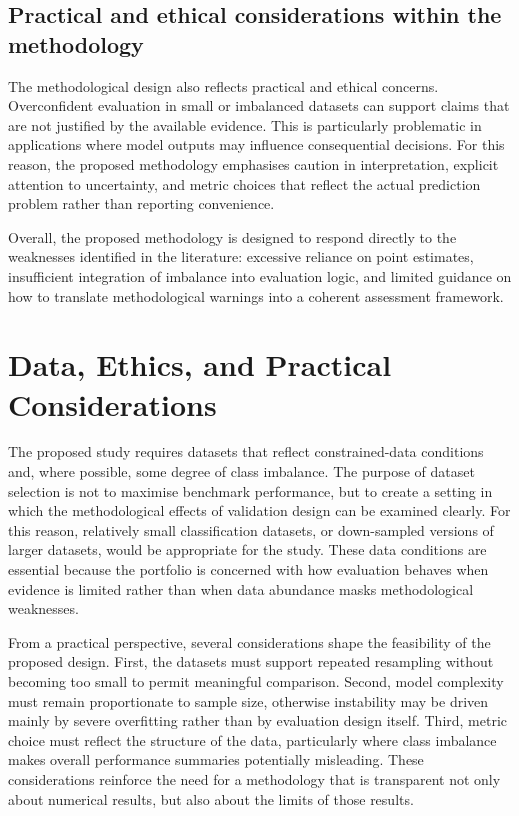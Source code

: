 \documentclass[11pt,a4paper]{article}
\begin{document}
\subsection{Practical and ethical considerations within the methodology}

The methodological design also reflects practical and ethical concerns. Overconfident evaluation in small or imbalanced datasets can support claims that are not justified by the available evidence. This is particularly problematic in applications where model outputs may influence consequential decisions. For this reason, the proposed methodology emphasises caution in interpretation, explicit attention to uncertainty, and metric choices that reflect the actual prediction problem rather than reporting convenience.

Overall, the proposed methodology is designed to respond directly to the weaknesses identified in the literature: excessive reliance on point estimates, insufficient integration of imbalance into evaluation logic, and limited guidance on how to translate methodological warnings into a coherent assessment framework.

\section{Data, Ethics, and Practical Considerations}

The proposed study requires datasets that reflect constrained-data conditions and, where possible, some degree of class imbalance. The purpose of dataset selection is not to maximise benchmark performance, but to create a setting in which the methodological effects of validation design can be examined clearly. For this reason, relatively small classification datasets, or down-sampled versions of larger datasets, would be appropriate for the study. These data conditions are essential because the portfolio is concerned with how evaluation behaves when evidence is limited rather than when data abundance masks methodological weaknesses.

From a practical perspective, several considerations shape the feasibility of the proposed design. First, the datasets must support repeated resampling without becoming too small to permit meaningful comparison. Second, model complexity must remain proportionate to sample size, otherwise instability may be driven mainly by severe overfitting rather than by evaluation design itself. Third, metric choice must reflect the structure of the data, particularly where class imbalance makes overall performance summaries potentially misleading. These considerations reinforce the need for a methodology that is transparent not only about numerical results, but also about the limits of those results.
\end{document}
